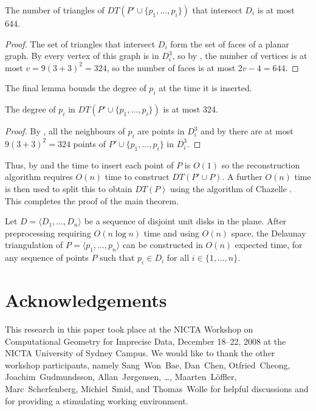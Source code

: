 \documentclass[lotsofwhite]{patmorin}
\begin{document}
\begin{lem}
The number of triangles of $DT(P'\cup\{p_1,\ldots,p_i\})$ that
intersect $D_i$ is at most 644.
\end{lem}

\begin{proof}
The set of triangles that intersect $D_i$ form the set of faces of a
planar graph.  By  every vertex of this graph is in
$D_i^3$, so by , the number of vertices 
is at most $v=9(3+3)^2=324$, so the number of faces is at most
$2v-4=644$. 
\end{proof}

The final lemma bounds the degree of $p_i$ at the time it is inserted.

\begin{lem}
The degree of $p_i$ in $DT(P'\cup\{p_1,\ldots,p_i\})$ is at most 324.
\end{lem}

\begin{proof}
By , all the neighbours of $p_i$ are points in $D_i^3$
and by  there are at most $9(3+3)^2=324$ points
of $P'\cup\{p_1,\ldots,p_i\}$ in $D_i^3$.
\end{proof}

Thus, by  and  the time to insert
each point of $P$ is $O(1)$ so the reconstruction algorithm requires
$O(n)$ time to construct $DT(P'\cup P)$.  A further $O(n)$ time is
then used to split this to obtain $DT(P)$ using the algorithm of
Chazelle \etal.  This completes the proof of the main theorem.

\begin{thm}
Let $D=\langle D_1,\ldots,D_n\rangle$ be a sequence of disjoint unit
disks in the plane.  After preprocessing requiring $O(n\log n)$ time
and using $O(n)$ space, the Delaunay triangulation of $P=\langle
p_1,\ldots,p_n\rangle$ can be constructed in $O(n)$ expected time, for any
sequence of points $P$ such that $p_i\in D_i$ for all
$i\in\{1,\ldots,n\}$.
\end{thm}

\section*{Acknowledgements}

This research in this paper took place at the NICTA Workshop on
Computational Geometry for Imprecise Data, December 18--22, 2008 at
the NICTA University of Sydney Campus.  We would like to thank the
other workshop participants, namely
Sang~Won~Bae,
Dan~Chen,
Otfried~Cheong,
Joachim~Gudmundsson,
Allan~J\o rgensen,
\ldots,
Maarten~L\"offler,
Marc~Scherfenberg,
Michiel~Smid,
and
Thomas~Wolle
for helpful discussions and for providing a stimulating working
environment.



\end{document}

